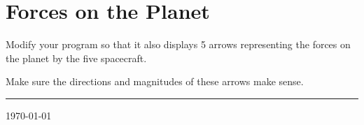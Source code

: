 \documentclass[10pt]{article}
\begin{document}
\checkpoint


\section{Forces on the Planet}


 

\begin{compactitem}[\color{MIRed}$\Rightarrow$]
\item Modify your program so that it also displays 5 arrows representing the forces on the planet by the five spacecraft.
\item Make sure the directions and magnitudes of these arrows make sense.
\end{compactitem}

\vspace{24pt}
\hrule



\vfill
{\footnotesize \today}
\end{document}
